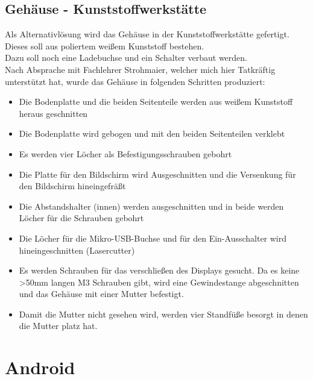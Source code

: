 \documentclass[12pt,a4paper]{article}
\begin{document}
{\newpage
\subsection{Gehäuse - Kunststoffwerkstätte}

Als Alternativlösung wird das Gehäuse in der Kunststoffwerkstätte gefertigt. Dieses soll aus poliertem weißem Kunststoff bestehen. \\
Dazu soll noch eine Ladebuchse und ein Schalter verbaut werden. \\
Nach Absprache mit Fachlehrer Strohmaier, welcher mich hier Tatkräftig unterstützt hat, wurde das Gehäuse in folgenden Schritten produziert:
\begin{itemize}
	\item{Die Bodenplatte und die beiden Seitenteile werden aus weißem Kunststoff heraus geschnitten}
	\item{Die Bodenplatte wird gebogen und mit den beiden Seitenteilen verklebt}
	\item{Es werden vier Löcher als Befestigungsschrauben gebohrt}
	\item{Die Platte für den Bildschirm wird Ausgeschnitten und die Versenkung für den Bildschirm hineingefräßt}
	\item{Die Abstandshalter (innen) werden ausgeschnitten und in beide werden Löcher für die Schrauben gebohrt}
	\item{Die Löcher für die Mikro-USB-Buchse und für den Ein-Ausschalter wird hineingeschnitten (Lasercutter)}
	\item{Es werden Schrauben für das verschließen des Displays gesucht. Da es keine >50mm langen M3 Schrauben gibt, wird eine Gewindestange abgeschnitten und das Gehäuse mit einer Mutter befestigt.}
	\item{Damit die Mutter nicht gesehen wird, werden vier Standfüße besorgt in denen die Mutter platz hat.}
\end{itemize}


\clearpage\vfill\newpage{}
\section{Android}
\label{SEC:android}

\clearpage\vfill\newpage{}
}
\end{document}
